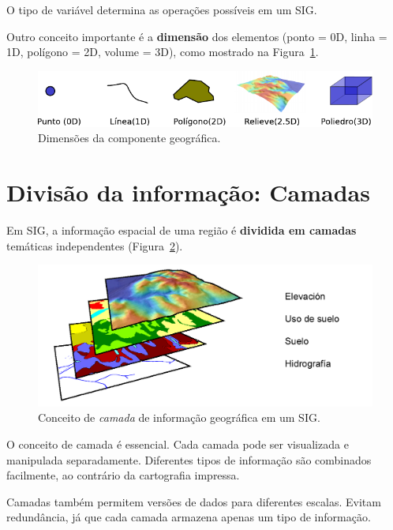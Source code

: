 O tipo de variável determina as operações possíveis em um SIG.

Outro conceito importante é a \textbf{dimensão} dos elementos (ponto = 0D, linha = 1D, polígono = 2D, volume = 3D), como mostrado na Figura~\ref{Fig:Dimensiones}.

\begin{figure}[!hbt] 
\centering
\includegraphics[width=\textwidth]{dados/Dimensiones.pdf}
\caption{\small Dimensões da componente geográfica.}
\label{Fig:Dimensiones} 
\end{figure}

\section{Divisão da informação: Camadas}

Em SIG, a informação espacial de uma região é \textbf{dividida em camadas} temáticas independentes (Figura~\ref{Fig:Concepto_capa}).

\begin{figure}[!hbt] 
\centering
\includegraphics[width=\textwidth]{dados/Concepto_capa.png}
\caption{\small Conceito de \emph{camada} de informação geográfica em um SIG.}
\label{Fig:Concepto_capa} 
\end{figure}

O conceito de camada é essencial. Cada camada pode ser visualizada e manipulada separadamente. Diferentes tipos de informação são combinados facilmente, ao contrário da cartografia impressa.

Camadas também permitem versões de dados para diferentes escalas. Evitam redundância, já que cada camada armazena apenas um tipo de informação.

